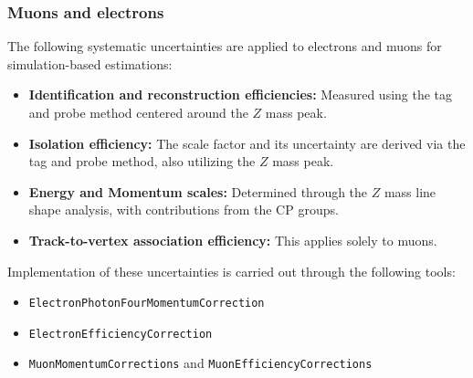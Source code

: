 
\subsubsection*{Muons and electrons}
The following systematic uncertainties are applied to electrons and muons for simulation-based estimations:

\begin{itemize}
    \item \textbf{Identification and reconstruction efficiencies:} Measured using the tag and probe method centered around the $Z$ mass peak.
    \item \textbf{Isolation efficiency:} The scale factor and its uncertainty are derived via the tag and probe method, also utilizing the $Z$ mass peak.
    \item \textbf{Energy and Momentum scales:} Determined through the $Z$ mass line shape analysis, with contributions from the CP groups.
    \item \textbf{Track-to-vertex association efficiency:} This applies solely to muons.
\end{itemize}

Implementation of these uncertainties is carried out through the following tools:
\begin{itemize}
    \item \texttt{ElectronPhotonFourMomentumCorrection} \cite{EgammaCalibration}
    \item \texttt{ElectronEfficiencyCorrection} \cite{AsgElectronEfficiencyCorrectionTool}
    \item \texttt{MuonMomentumCorrections} and \texttt{MuonEfficiencyCorrections} \cite{MCPAnalysisGuidelines}
\end{itemize}


